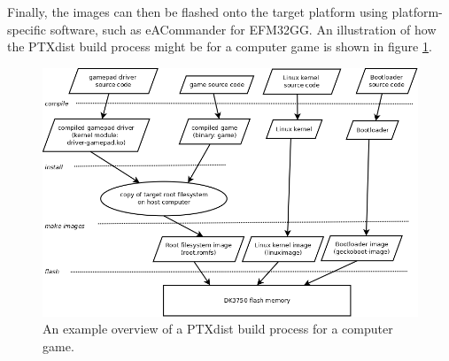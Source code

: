 Finally, the images can then be flashed onto the target platform using platform-specific software, such as eACommander for EFM32GG. An illustration of how the PTXdist build process might be for a computer game is shown in figure \ref{fig:ptxdist-build-process}.
\begin{figure}[ht]\label{fig:ptxdist-build-process}
  \includegraphics[width=\textwidth]{images/ptxdist_build_process.png}
  \caption{An example overview of a PTXdist build process for a computer game.}
\end{figure}

